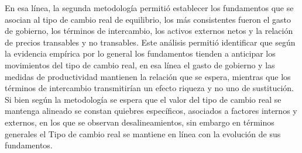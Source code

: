 \documentclass[12pt,letterpaper]{article}
\begin{document}


En esa línea, la segunda metodología permitió establecer los fundamentos que se asocian al tipo de cambio real de equilibrio, los más consistentes fueron el gasto de gobierno, los términos de intercambio, los activos externos netos y la relación de precios transables y no transables. Este análisis permitió identificar que según la evidencia empírica por lo general los fundamentos tienden a anticipar los movimientos del tipo de cambio real, en esa línea el gasto de gobierno y las medidas de productividad mantienen la relación que se espera, mientras que los términos de intercambio transmitirían un efecto riqueza y no uno de sustitución. Si bien según la metodología se espera que el valor del tipo de cambio real se mantenga alineado se constan quiebres específicos, asociados a factores internos y externos, en los que se observan desalineamientos, sin embargo en términos generales el Tipo de cambio real se mantiene en línea con la evolución de sus fundamentos. 







\end{document}
